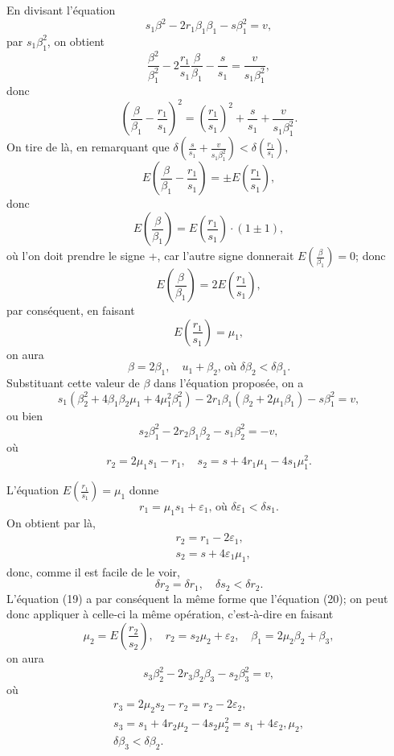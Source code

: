 \documentclass[oneside, 12 pt, leqno]{memoir}
\begin{document}
En divisant l'équation
\[\tag{19}s_1 \beta^2-2 r_1 \beta_1 \beta_1-s \beta_1^2=v,\]
par \(s_1 \beta_1^2\), on obtient
\[\frac{\beta^2}{\beta_1^2}-2 \frac{r_1}{s_1}\frac{\beta}{\beta_1}-\frac{s}{s_1}=\frac{v}{s_1 \beta_1^2},\]
donc
\[\left(\frac{\beta}{\beta_1}-\frac{r_1}{s_1}\right)^2=\left(\frac{r_1}{s_1}\right)^2+\frac{s}{s_1}+\frac{v}{s_1 \beta_1^2}.\]
On tire de là, en remarquant que \(\delta\left(\frac{s}{s_1}+\frac{v}{s_1 \beta_1^2}\right)<\delta\left(\frac{r_1}{s_1}\right),\)
\[E\left(\frac{\beta}{\beta_1}-\frac{r_1}{s_1}\right)= \pm E\left(\frac{r_1}{s_1}\right),\]
donc
\[E\left(\frac{\beta}{\beta_1}\right)=E\left(\frac{r_1}{s_1}\right) \cdot(1 \pm 1),\]
où l'on doit prendre le signe +, car l'autre signe donnerait \(E\left(\frac{\beta}{\beta_1}\right)=0\); donc
\[E\left(\frac{\beta}{\beta_1}\right)=2 E\left(\frac{r_1}{s_1}\right),\]
par conséquent, en faisant
\[E\left(\frac{r_1}{s_1}\right)=\mu_1,\]
on aura
\[\beta=2 \beta_1, \quad u_1+\beta_2 \text {, où } \delta \beta_2<\delta \beta_1.\]
Substituant cette valeur de \(\beta\) dans l'équation proposée, on a
\[s_1\left(\beta_2^2+4 \beta_1 \beta_2 \mu_1+4 \mu_1^2 \beta_1^2\right)-2 r_1 \beta_1\left(\beta_2+2 \mu_1 \beta_1\right)-s \beta_1^2=v,\]
ou bien
\[\tag{20}s_2 \beta_1^2-2 r_2 \beta_1 \beta_2-s_1 \beta_2^2=-v,\]
où
\[r_2=2 \mu_1 s_1-r_1, \quad s_2=s+4 r_1 \mu_1-4 s_1 \mu_1^2.\]

L'équation \(E\left(\frac{r_1}{s_1}\right)=\mu_1\) donne
\[r_1=\mu_1 s_1+\varepsilon_1 \text {, où } \delta \varepsilon_1<\delta s_1.\]
On obtient par là,
\[\begin{aligned}
& r_2=r_1-2 \varepsilon_1, \\
& s_2=s+4 \varepsilon_1 \mu_1,
\end{aligned}\]
donc, comme il est facile de le voir,
\[\delta r_2=\delta r_1, \quad \delta s_2<\delta r_2.\]
L'équation (19) a par conséquent la même forme que l'équation (20); on peut donc appliquer à celle-ci la même opération, c'est-à-dire en faisant
\[\mu_2=E\left(\frac{r_2}{s_2}\right), \quad r_2=s_2 \mu_2+\varepsilon_2, \quad \beta_1=2 \mu_2 \beta_2+\beta_3,\]
on aura
\[s_3 \beta_2^{2}-2 r_3 \beta_2 \beta_3-s_2 \beta_3^2=v,\]
où
\[\begin{gathered}
r_3=2 \mu_2 s_2-r_2=r_2-2 \varepsilon_2, \\
s_3=s_1+4 r_2 \mu_2-4 s_2 \mu_2^2=s_1+4 \varepsilon_2, \mu_2, \\
\delta \beta_3<\delta \beta_2.
\end{gathered}\]
\end{document}

